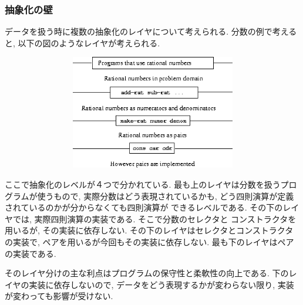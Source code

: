 \subsubsection{抽象化の壁}
データを扱う時に複数の抽象化のレイヤについて考えられる.
分数の例で考えると, 以下の図のようなレイヤが考えられる.

\begin{figure}[h]
  \centering
  \includegraphics[width=12cm,height=5cm]{imgs/abstraction-barrier.png}
\end{figure}

ここで抽象化のレベルが４つで分かれている. 最も上のレイヤは分数を扱うプログラムが使うもので,
実際分数はどう表現されているかも, どう四則演算が定義されているのかが分からなくても四則演算が
できるレベルである. その下のレイヤでは, 実際四則演算の実装である. そこで分数のセレクタと
コンストラクタを用いるが, その実装に依存しない. その下のレイヤはセレクタとコンストラクタの実装で,
ペアを用いるが今回もその実装に依存しない. 最も下のレイヤはペアの実装である.

そのレイヤ分けの主な利点はプログラムの保守性と柔軟性の向上である.
下のレイヤの実装に依存しないので, データをどう表現するかが変わらない限り,
実装が変わっても影響が受けない.
